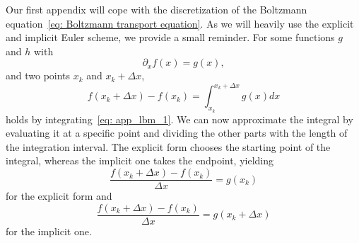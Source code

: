 Our first appendix will cope with the discretization of the Boltzmann equation~\eqref{eq: Boltzmann transport equation}.
As we will heavily use the explicit and implicit Euler scheme, we provide a small reminder.
For some functions $g$ and $h$ with
\begin{equation}
  \label{eq: app_lbm_1}
  \partial_x f(x) = g(x),
\end{equation}
and two points $x_k$ and $x_k + \Delta x$,
\begin{equation}
  f(x_k+\Delta x) - f(x_k) = \int_{x_k}^{x_k+\Delta x} g(x) dx
\end{equation}
holds by integrating~\eqref{eq: app_lbm_1}.
We can now approximate the integral by evaluating it at a specific point and dividing the other parts with the length of the integration interval.
The explicit form chooses the starting point of the integral, whereas the implicit one takes the endpoint, yielding
\begin{equation}
  \frac{f(x_k+\Delta x) - f(x_k)}{\Delta x} =  g(x_k)
\end{equation}
for the explicit form and
\begin{equation}
  \frac{f(x_k+\Delta x) - f(x_k)}{\Delta x} =  g(x_k + \Delta x)
\end{equation}
for the implicit one.

